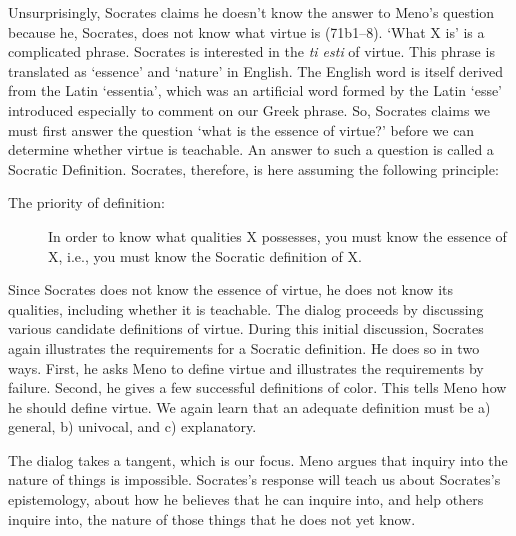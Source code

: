 \documentclass[10 pt]{article}
\begin{document}
Unsurprisingly, Socrates claims he doesn't know the answer to Meno's question because he, Socrates, does not know what virtue is (71b1--8). `What X is' is a complicated phrase. Socrates is interested in the \emph{ti esti} of virtue. This phrase is translated as `essence' and `nature' in English. The English word  is itself derived from the Latin `essentia', which was an artificial word formed by the Latin `esse' introduced especially to comment on our Greek phrase. So, Socrates claims we must first answer the question `what is the essence of virtue?' before we can determine whether virtue is teachable. An answer to such a question is called a Socratic Definition. Socrates, therefore, is here assuming the following principle: 
\begin{description}
\item[The priority of definition:] In order to know what qualities X possesses, you must know the essence of X, i.e., you must know the Socratic definition of X. 
\end{description}
Since Socrates does not know the essence of virtue, he does not know its qualities, including whether it is teachable. The dialog proceeds by discussing  various candidate definitions of virtue. During this initial discussion, Socrates again illustrates the requirements for a Socratic definition. He does so in two ways. First, he asks Meno to define virtue and illustrates the requirements by failure. Second, he gives a few successful definitions of color. This tells Meno how he should define virtue. We again learn that an adequate definition must be a) general, b) univocal, and c) explanatory. 


 The dialog takes a tangent, which is our focus. Meno argues that inquiry into the nature of things is impossible. Socrates's response will teach us about Socrates's epistemology, about how he believes that he can inquire into, and help others inquire into, the nature of those things that he does not yet know. 
\end{document}
